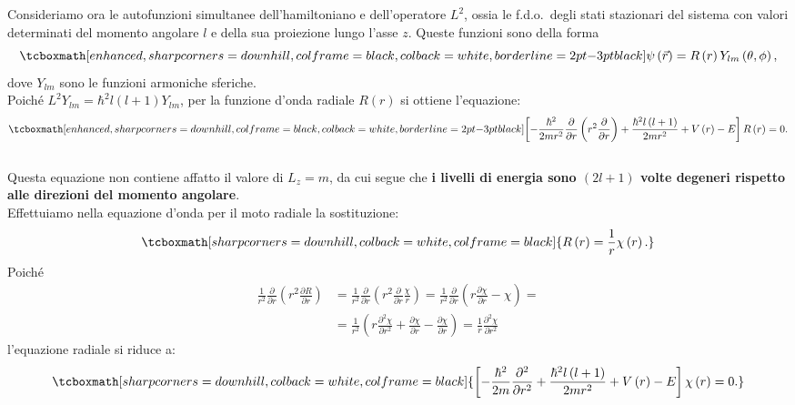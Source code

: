 Consideriamo ora le autofunzioni simultanee dell'hamiltoniano e dell'operatore $L^2$, ossia le f.d.o.~degli stati stazionari del sistema con valori determinati del momento angolare $l$ e della sua proiezione lungo l'asse $z$. Queste funzioni sono della forma
	\begin{equation}
		\tcboxmath[enhanced, sharp corners=downhill, colframe=black, colback=white, borderline={2pt}{-3pt}{black}]{
			\psi\left(\vec{r}\right)=R\left(r\right)Y_{lm}\left(\theta,\phi\right) ,
			}
	\end{equation}
dove $Y_{lm}$ sono le funzioni armoniche sferiche.\\

Poiché $L^2Y_{lm}=\hbar^2l\left(l+1\right)Y_{lm}$, per la funzione d'onda radiale $R\left(r\right)$ si ottiene l'equazione:
	\begin{equation}
		\tcboxmath[enhanced, sharp corners=downhill, colframe=black, colback=white, borderline={2pt}{-3pt}{black}]{
			\left[-\frac{\hbar^2}{2mr^2}\frac{\partial}{\partial r}\left(r^2\frac{\partial}{\partial r}\right)+\frac{\hbar^2l\left(l+1\right)}{2mr^2}+V\left(r\right)-E\right]R\left(r\right)=0 .
			}
	\end{equation}\\
	
Questa equazione non contiene affatto il valore di $L_z=m$, da cui segue che \textbf{i livelli di energia sono $\left(2l+1\right)$ volte degeneri rispetto alle direzioni del momento angolare}.\\

Effettuiamo nella equazione d'onda per il moto radiale la sostituzione:
	\begin{equation}
		\tcboxmath[sharp corners=downhill, colback=white, colframe=black]{
			R\left(r\right)=\frac{1}{r}\chi\left(r\right) .
			}
	\end{equation}
Poiché
	\begin{align}
		\frac{1}{r^2}\frac{\partial}{\partial r}\left(r^2\frac{\partial R}{\partial r}\right)&=\frac{1}{r^2}\frac{\partial}{\partial r}\left(r^2\frac{\partial}{\partial r}\frac{\chi}{r}\right)=\frac{1}{r^2}\frac{\partial}{\partial r}\left(r \frac{\partial\chi}{\partial r}-\chi\right)= \nonumber \\
		&= \frac{1}{r^2}\left(r\frac{\partial^2\chi}{\partial r^2}+\frac{\partial\chi}{\partial r}-\frac{\partial\chi}{\partial r}\right) = \frac{1}{r}\frac{\partial^2 \chi}{\partial r^2}
\end{align}
l'equazione radiale si riduce a:
	\begin{equation}
		\tcboxmath[sharp corners=downhill, colback=white, colframe=black]{
			\left[-\frac{\hbar^2}{2m}\frac{\partial^2}{\partial r^2}+\frac{\hbar^2l\left(l+1\right)}{2mr^2}+V\left(r\right)-E\right]\chi\left(r\right)=0 .
			}
	\end{equation}\\

